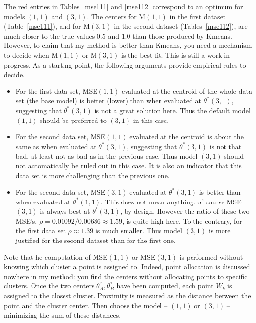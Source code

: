 \documentclass[oneside,10pt]{book}
\begin{document}
The red entries in Tables~\ref{mse111} and \ref{mse112} correspond to an optimum for models $(1,1)$ and $(3,1)$. The centers for M$(1,1)$ in the first dataset (Table~\ref{mse111}), and for M$(3,1)$ in the second dataset (Tables~\ref{mse112}), are much closer to the true values 
$0.5$ and $1.0$ than those produced by Kmeans. However, to claim that my method is better than Kmeans, you need a mechanism to decide
 when M$(1,1)$ or M$(3,1)$ is the best fit.  This is still a work in progress. 
As a starting point, the following arguments provide empirical rules to decide.
\begin{itemize}
\item For the first data set, MSE$(1,1)$ evaluated at the centroid of the whole data set (the base model) 
 is better (lower) than when evaluated at $\theta^*(3,1)$, suggesting that $\theta^*(3,1)$ is not a great solution here. Thus the default model $(1,1)$ 
 should be
preferred to $(3,1)$ in this case.
\item For the second data set, MSE$(1,1)$ evaluated at the centroid 
 is about the same as when evaluated at $\theta^*(3,1)$, suggesting that $\theta^*(3,1)$ is not that bad, at least not as bad as in the previous case. Thus model $(3,1)$ should not automatically be ruled out in this case. It is also an indicator that this data set is more challenging than the previous one.
\item For the second data set, MSE$(3,1)$ evaluated at  $\theta^*(3,1)$ is better than when evaluated at $\theta^*(1,1)$. This does not mean
anything: of course MSE$(3,1)$ is always best at $\theta^*(3,1)$, by design. 
However the ratio of these two MSE's,  $\rho = 0.01092 / 0.00686 \approx 1.59$, is quite high here. To the contrary, for the first data set  
$\rho \approx 1.39$ is much smaller. Thus model $(3,1)$ is more justified for the second dataset than for the
 first one.
\end{itemize} 

\noindent Note that he computation of MSE$(1,1)$ or MSE$(3,1)$ is performed without knowing which cluster a point is assigned to. Indeed, point allocation is discussed nowhere in my method: you find the centers without allocating points to specific clusters. Once the two centers 
$\theta_A^*,\theta_B^*$ have been computed, each point $W_k$ is assigned to the closest cluster. Proximity is measured as the distance between the point and the cluster center. 
Then choose the model -- $(1,1)$ or $(3, 1)$ -- minimizing the sum of these distances. 
\end{document}
